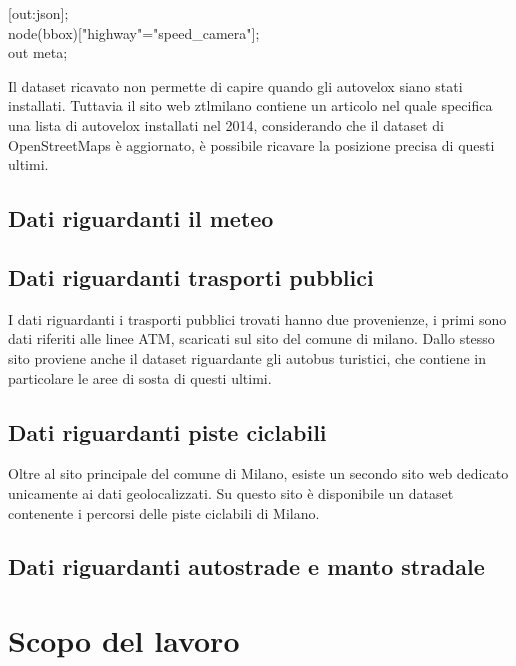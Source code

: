\documentclass[a4paper]{report}
\begin{document}
[out:json];\\
node({{bbox}})["highway"="speed\_camera"];\\
out meta;

Il dataset ricavato non permette di capire quando gli autovelox siano stati installati.
Tuttavia il sito web ztlmilano contiene un articolo nel quale specifica una lista di 
autovelox installati nel 2014, considerando che il dataset di OpenStreetMaps è aggiornato, 
è possibile ricavare la posizione precisa di questi ultimi.

\subsection{Dati riguardanti il meteo}

\subsection{Dati riguardanti trasporti pubblici}
I dati riguardanti i trasporti pubblici trovati hanno due provenienze, i primi sono 
dati riferiti alle linee ATM, scaricati sul sito del comune di milano.
Dallo stesso sito proviene anche il dataset riguardante gli autobus turistici, che 
contiene in particolare le aree di sosta di questi ultimi.

\subsection{Dati riguardanti piste ciclabili}
Oltre al sito principale del comune di Milano, esiste un secondo sito web dedicato 
unicamente ai dati geolocalizzati. Su questo sito è disponibile un dataset contenente 
i percorsi delle piste ciclabili di Milano.

\subsection{Dati riguardanti autostrade e manto stradale}

\section{Scopo del lavoro}

\end{document}
